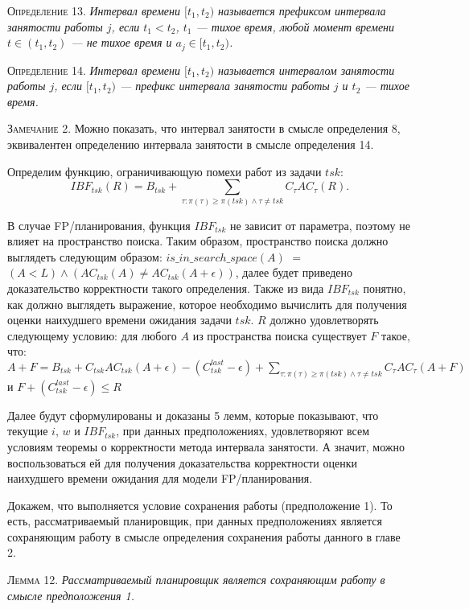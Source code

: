 \documentclass[14pt]{matmex-diploma-custom}
\begin{document}
\textsc{Определение 13.}
\textit{Интервал времени $[t_1, t_2)$ называется префиксом интервала занятости работы $j$, 
  если $t_1 < t_2$, $t_1$ --- тихое время, любой момент времени $t \in (t_1, t_2)$ --- не тихое время и 
  $a_{j} \in [t_1, t_2)$. }

\textsc{Определение 14.}
\textit{Интервал времени $[t_1, t_2)$ называется интервалом занятости работы $j$, 
  если $[t_1, t_2)$ --- префикс интервала занятости работы $j$ и $t_2$ --- тихое время. }

\textsc{Замечание 2.} Можно показать, что интервал занятости в смысле определения 8, 
  эквивалентен определению интервала занятости в смысле определения 14.

Определим функцию, ограничивающую помехи работ из задачи $tsk$:
  $$IBF_{tsk}(R) = B_{tsk} + \sum_{\tau:\pi(\tau) \geq \pi(tsk) \wedge \tau \neq tsk} C_{\tau}AC_{\tau}(R).$$


В случае FP\-/планирования, функция $IBF_{tsk}$ не зависит от параметра, поэтому 
  не влияет на пространство поиска. Таким образом, пространство поиска должно выглядеть следующим
  образом: $is\_in\_search\_space(A)$ $=$ $(A < L) \wedge (AC_{tsk}(A) \neq AC_{tsk}(A + \epsilon))$, 
  далее будет приведено доказательство корректности такого определения. 
  Также из вида $IBF_{tsk}$ понятно, как должно выглядеть выражение, которое необходимо 
  вычислить для получения оценки наихудшего времени ожидания задачи $tsk$. 
  $R$ должно удовлетворять следующему условию: для любого $A$ из пространства поиска 
  существует $F$ такое, что: $A + F = B_{tsk} +  C_{tsk}AC_{tsk}(A + \epsilon) - (C_{tsk}^{last} - \epsilon) + 
    \sum_{\tau:\pi(\tau) \geq \pi(tsk) \wedge \tau \neq tsk} C_{\tau}AC_{\tau}(A+F)$ и $F + (C_{tsk}^{last} - \epsilon) \leq R$

Далее будут сформулированы и доказаны 5 лемм, которые показывают, что 
  текущие $i$, $w$ и $IBF_{tsk}$, при данных предположениях, удовлетворяют всем условиям 
  теоремы о корректности метода интервала занятости. А значит, можно воспользоваться ей  
  для получения доказательства корректности оценки наихудшего времени ожидания для модели FP\-/планирования.

Докажем, что выполняется условие сохранения работы (предположение 1). 
  То есть, рассматриваемый планировщик, при данных предположениях является 
  сохраняющим работу в смысле определения сохранения работы данного в главе 2.


\textsc{Лемма 12.}
\textit{Рассматриваемый планировщик является сохраняющим работу в смысле предположения 1.}
 
\end{document}
